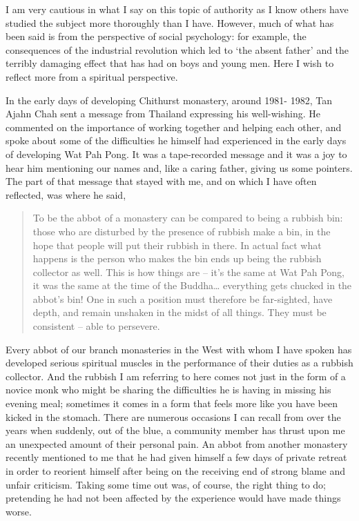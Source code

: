 I am very cautious in what I say on this topic of authority as I know
others have studied the subject more thoroughly than I have. However,
much of what has been said is from the perspective of social psychology:
for example, the consequences of the industrial revolution which led to
`the absent father' and the terribly damaging effect that has had on
boys and young men. Here I wish to reflect more from a spiritual
perspective.

In the early days of developing Chithurst monastery, around 1981- 1982,
Tan Ajahn Chah sent a message from Thailand expressing his well-wishing.
He commented on the importance of working together and helping each
other, and spoke about some of the difficulties he himself had
experienced in the early days of developing Wat Pah Pong. It was a
tape-recorded message and it was a joy to hear him mentioning our names
and, like a caring father, giving us some pointers. The part of that
message that stayed with me, and on which I have often reflected, was
where he said,

\begin{quotation}
To be the abbot of a monastery can be compared to being a rubbish bin:
those who are disturbed by the presence of rubbish make a bin, in the
hope that people will put their rubbish in there. In actual fact what
happens is the person who makes the bin ends up being the rubbish
collector as well. This is how things are -- it's the same at Wat Pah
Pong, it was the same at the time of the Buddha\ldots{} everything gets
chucked in the abbot's bin! One in such a position must therefore be
far-sighted, have depth, and remain unshaken in the midst of all things.
They must be consistent -- able to persevere.
\end{quotation}

Every abbot of our branch monasteries in the West with whom I have
spoken has developed serious spiritual muscles in the performance of
their duties as a rubbish collector. And the rubbish I am referring to
here comes not just in the form of a novice monk who might be sharing
the difficulties he is having in missing his evening meal; sometimes it
comes in a form that feels more like you have been kicked in the
stomach. There are numerous occasions I can recall from over the years
when suddenly, out of the blue, a community member has thrust upon me an
unexpected amount of their personal pain. An abbot from another
monastery recently mentioned to me that he had given himself a few days
of private retreat in order to reorient himself after being on the
receiving end of strong blame and unfair criticism. Taking some time out
was, of course, the right thing to do; pretending he had not been
affected by the experience would have made things worse.

